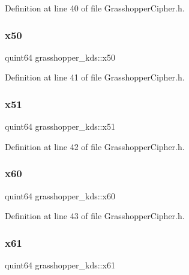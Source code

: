 Definition at line 40 of file Grasshopper\+Cipher.\+h.

\mbox{\label{structgrasshopper__kds_a093735e04fc32f9a392bdcc969d7374a}} 
\subsubsection{\texorpdfstring{x50}{x50}}
{\footnotesize\ttfamily quint64 grasshopper\+\_\+kds\+::x50}



Definition at line 41 of file Grasshopper\+Cipher.\+h.

\mbox{\label{structgrasshopper__kds_ad351467a4660d29ff241bc7535475b10}} 
\subsubsection{\texorpdfstring{x51}{x51}}
{\footnotesize\ttfamily quint64 grasshopper\+\_\+kds\+::x51}



Definition at line 42 of file Grasshopper\+Cipher.\+h.

\mbox{\label{structgrasshopper__kds_a78c3589eabf21d18d029ac580f2ebf8f}} 
\subsubsection{\texorpdfstring{x60}{x60}}
{\footnotesize\ttfamily quint64 grasshopper\+\_\+kds\+::x60}



Definition at line 43 of file Grasshopper\+Cipher.\+h.

\mbox{\label{structgrasshopper__kds_a6052a28c6ad1741674db84296ee5798d}} 
\subsubsection{\texorpdfstring{x61}{x61}}
{\footnotesize\ttfamily quint64 grasshopper\+\_\+kds\+::x61}



